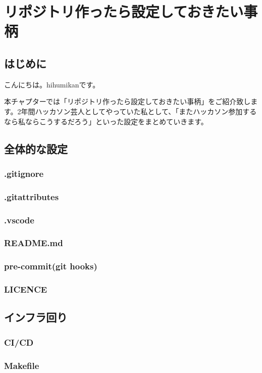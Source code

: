 \chapter{リポジトリ作ったら設定しておきたい事柄}
\section{はじめに}
こんにちは。hihumikanです。

本チャプターでは「リポジトリ作ったら設定しておきたい事柄」をご紹介致します。2年間ハッカソン芸人としてやっていた私として、「またハッカソン参加するなら私ならこうするだろう」といった設定をまとめていきます。

\section{全体的な設定}

\subsection{.gitignore}
\subsection{.gitattributes}
\subsection{.vscode}
\subsection{README.md}
\subsection{pre-commit(git hooks)}
\subsection{LICENCE}

\section{インフラ回り}

\subsection{CI/CD}
\subsection{Makefile}
